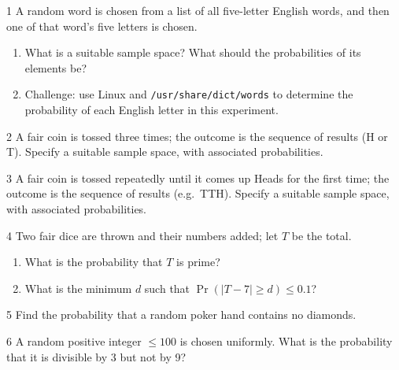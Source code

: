 
\begin{exercise}{1}
    A random word is chosen from a list of all five-letter English words, and
    then one of that word's five letters is chosen.
    \begin{enumerate}[label=(\alph*)]
        \item What is a suitable sample space? What should the probabilities of
              its elements be?
        \item Challenge: use Linux and \texttt{/usr/share/dict/words} to
              determine the probability of each English letter in this
              experiment.
    \end{enumerate}
\end{exercise}

\begin{exercise}{2}
    A fair coin is tossed three times; the outcome is the sequence of results (H
    or T). Specify a suitable sample space, with associated probabilities.
\end{exercise}

\begin{exercise}{3}
    A fair coin is tossed repeatedly until it comes up Heads for the first time;
    the outcome is the sequence of results (e.g.\ TTH). Specify a suitable sample
    space, with associated probabilities.
\end{exercise}

\begin{exercise}{4}
    Two fair dice are thrown and their numbers added; let $T$ be the total.
    \begin{enumerate}[label=(\alph*)]
        \item What is the probability that $T$ is prime?
        \item What is the minimum $d$ such that $\Pr(|T-7|\ge d)\le0.1$?
    \end{enumerate}
\end{exercise}

\begin{exercise}{5}
    Find the probability that a random poker hand contains no diamonds.
\end{exercise}

\begin{exercise}{6}
    A random positive integer $\le100$ is chosen uniformly. What is the
    probability that it is divisible by 3 but not by 9?
\end{exercise}

